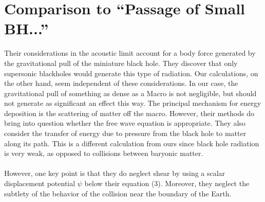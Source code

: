 \documentclass{article}
\begin{document}
\pagebreak
\section{Comparison to ``Passage of Small BH...''}
Their considerations in the acoustic limit account for a body force generated by the gravitational pull of the miniature black hole. They discover that only supersonic blackholes would generate this type of radiation. Our calculations, on the other hand, seem independent of these considerations. In our case, the gravitational pull of something as dense as a Macro is not negligible, but should not generate as significant an effect this way. The principal mechanism for energy deposition is the scattering of matter off the macro. However, their methods do bring into question whether the free wave equation is appropriate. They also consider the transfer of energy due to pressure from the black hole to matter along its path. This is a different calculation from ours since black hole radiation is very weak, as opposed to collisions between baryonic matter.
\\\\
However, one key point is that they do neglect shear by using a scalar displacement potential $\psi$ below their equation (3). Moreover, they neglect the subtlety of the behavior of the collision near the boundary of the Earth.

\pagebreak
\end{document}
